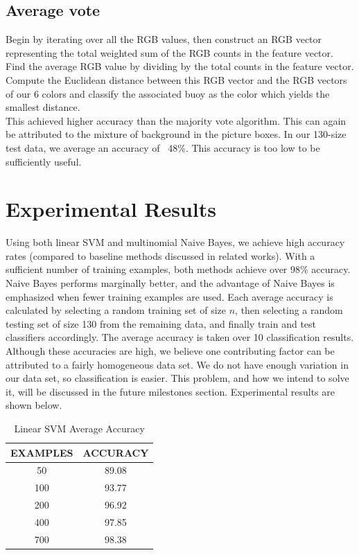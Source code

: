 \documentclass{article} %
\begin{document}
\subsection{Average vote}
Begin by iterating over all the RGB values, then construct an RGB vector representing the total weighted sum of the RGB counts in the feature vector. Find the average RGB value by dividing by the total counts in the feature vector. Compute the Euclidean distance between this RGB vector and the RGB vectors of our 6 colors and classify the associated buoy as the color which yields the smallest distance.\\
This achieved higher accuracy than the majority vote algorithm. This can again be attributed to the mixture of background in the picture boxes. In our 130-size test data, we average an accuracy of ~48\%. This accuracy is too low to be sufficiently useful.

\section{Experimental Results}
Using both linear SVM and multinomial Naive Bayes, we achieve high accuracy rates (compared to baseline methods discussed in related works). With a sufficient number of training examples, both methods achieve over 98\% accuracy. Naive Bayes performs marginally better, and the advantage of Naive Bayes is emphasized when fewer training examples are used. Each average accuracy is calculated by selecting a random training set of size $n$, then selecting a random testing set of size 130 from the remaining data, and finally train and test classifiers accordingly. The average accuracy is taken over 10 classification results. Although these accuracies are high, we believe one contributing factor can be attributed to a fairly homogeneous data set. We do not have enough variation in our data set, so classification is easier. This problem, and how we intend to solve it, will be discussed in the future milestones section. Experimental results are shown below.

\begin{table}[hp]
\caption{Linear SVM Average Accuracy}
\begin{center}
\begin{tabular}{c|c}
{\bf EXAMPLES}  &{\bf ACCURACY}
\\ \hline
50              &89.08 \\
100             &93.77 \\
200             &96.92 \\
400             &97.85 \\
700             &98.38 \\
\end{tabular}
\end{center}
\end{table}
\end{document}
